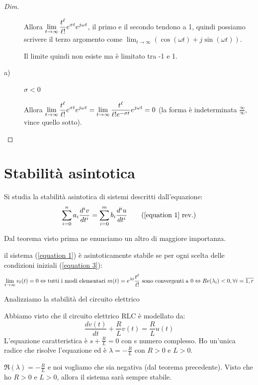 \begin{theorem}
\begin{proof}[Dim]
\begin{description}
		Allora $\displaystyle \lim_{t \to \infty} \frac{t^\ell}{\ell!} e^{\sigma t} e^{ j \omega t}$, il primo e il secondo tendono a 1, quindi possiamo scrivere il terzo argomento come $ \lim_{t \to \infty} ( \cos (\omega t) + j \sin (\omega t)) $.
		
		Il limite quindi non esiste ma è limitato tra -1 e 1.
		
		\item[a)] $ \sigma < 0$
		
		Allora $\displaystyle \lim_{t \to \infty} \frac{t^\ell}{\ell!} e^{\sigma t} e^{ j \omega t} = \lim_{t \to \infty} \frac{t^\ell }{\ell! e^{-\sigma t}}  e^{ j \omega t} = 0$ (la forma è indeterminata $\displaystyle \frac{\infty}{\infty}$, vince quello sotto).
	\end{description}	
		\end{proof}
	\end{theorem}


\section{Stabilità asintotica}
	
	Si studia la stabilità asintotica di sistemi descritti dall'equazione:
	\begin{equation*}
	\sum\limits_{i=0}^n a_{i} \frac{ d^{i} v }{ dt^{i}  } = \sum\limits_{i=0}^m b_{i} \frac{ d^{i} u }{ dt^{i}  }
	\tag{\ref{equation 1} rev.}
	\end{equation*}

	
	Dal teorema visto prima ne enunciamo un altro di maggiore importanza.
	
	\begin{theorem}
		il sistema (\ref{equation 1}) è asintoticamente stabile se per ogni scelta delle condizioni iniziali (\ref{equation 3}):
		\begin{equation*}
			\lim_{t \to \infty}v_\ell(t)=0
			\Leftrightarrow\text{tutti i modi elementari } m(t)=e^{\lambda t}\frac{t^\ell}{\ell!}\text{ sono convergenti a $0$}
			\Leftrightarrow Re(\lambda_i)<0,\forall i = \overline{1,r}
		\end{equation*}
	\end{theorem}
	\begin{nexample}
	Analizziamo la stabilità del circuito elettrico
	
	Abbiamo visto che il circuito elettrico RLC è modellato da:
	 \[ \frac{dv(t)}{dt} + \frac{R}{L} v(t) = \frac{R}{L} u(t) \]
	L'equazione caratteristica è $ s + \frac{R}{L}=0 $ con s numero complesso.
	Ho un'unica radice che risolve l'equazione ed è $ \lambda = - \frac{R}{L}$ con $ R > 0$ e $ L > 0$.
	
	$\Re(\lambda) = - \frac{R}{L}$ e noi vogliamo che sia negativa (dal teorema precedente). Visto che ho $ R > 0$ e $ L > 0$, allora il sistema sarà sempre stabile.
	\end{nexample}

